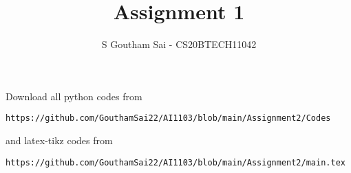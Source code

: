\documentclass[journal,12pt,twocolumn]{IEEEtran}
\DeclareMathOperator*{\Res}{Res}
\begin{document}
\newcommand{\BEQA}{\begin{eqnarray}}
\newcommand{\EEQA}{\end{eqnarray}}
\newcommand{\define}{\stackrel{\triangle}{=}}

\raggedbottom
\setlength{\parindent}{0pt}
\providecommand{\mbf}{\mathbf}
\providecommand{\pr}[1]{\ensuremath{\Pr\left(#1\right)}}
\providecommand{\qfunc}[1]{\ensuremath{Q\left(#1\right)}}
\providecommand{\sbrak}[1]{\ensuremath{{}\left[#1\right]}}
\providecommand{\lsbrak}[1]{\ensuremath{{}\left[#1\right.}}
\providecommand{\rsbrak}[1]{\ensuremath{{}\left.#1\right]}}
\providecommand{\brak}[1]{\ensuremath{\left(#1\right)}}
\providecommand{\lbrak}[1]{\ensuremath{\left(#1\right.}}
\providecommand{\rbrak}[1]{\ensuremath{\left.#1\right)}}
\providecommand{\cbrak}[1]{\ensuremath{\left\{#1\right\}}}
\providecommand{\lcbrak}[1]{\ensuremath{\left\{#1\right.}}
\providecommand{\rcbrak}[1]{\ensuremath{\left.#1\right\}}}
\theoremstyle{remark}
\newtheorem{rem}{Remark}
\newcommand{\sgn}{\mathop{\mathrm{sgn}}}
\providecommand{\abs}[1]{\vert#1\vert}
\providecommand{\res}[1]{\Res\displaylimits_{#1}} 
\providecommand{\norm}[1]{\lVert#1\rVert}
\providecommand{\mtx}[1]{\mathbf{#1}}
\providecommand{\mean}[1]{E[ #1 ]}
\providecommand{\fourier}{\overset{\mathcal{F}}{ \rightleftharpoons}}
\providecommand{\system}{\overset{\mathcal{H}}{ \longleftrightarrow}}
\newcommand{\solution}{\noindent \textbf{Solution: }}
\newcommand{\cosec}{\,\text{cosec}\,}
\providecommand{\dec}[2]{\ensuremath{\overset{#1}{\underset{#2}{\gtrless}}}}
\newcommand{\myvec}[1]{\ensuremath{\begin{pmatrix}#1\end{pmatrix}}}
\newcommand{\mydet}[1]{\ensuremath{\begin{vmatrix}#1\end{vmatrix}}}
\makeatletter
{}
\makeatother
\let\StandardTheFigure\thefigure
\let\vec\mathbf
\renewcommand{\thefigure}{\theproblem}
\def\putbox#1#2#3{\makebox[0in][l]{\makebox[#1][l]{}\raisebox{\baselineskip}[0in][0in]{\raisebox{#2}[0in][0in]{#3}}}}
     \def\rightbox#1{\makebox[0in][r]{#1}}
     \def\centbox#1{\makebox[0in]{#1}}
     \def\topbox#1{\raisebox{-\baselineskip}[0in][0in]{#1}}
     \def\midbox#1{\raisebox{-0.5\baselineskip}[0in][0in]{#1}}
\vspace{3cm}
\title{Assignment 1}
\author{S Goutham Sai - CS20BTECH11042}
\maketitle
\newpage
\bigskip
\renewcommand{\thefigure}{\theenumi}
\renewcommand{\thetable}{\theenumi}
Download all python codes from 
\begin{lstlisting}
https://github.com/GouthamSai22/AI1103/blob/main/Assignment2/Codes
\end{lstlisting}
%
and latex-tikz codes from 
%
\begin{lstlisting}
https://github.com/GouthamSai22/AI1103/blob/main/Assignment2/main.tex
\end{lstlisting}
\end{document}
